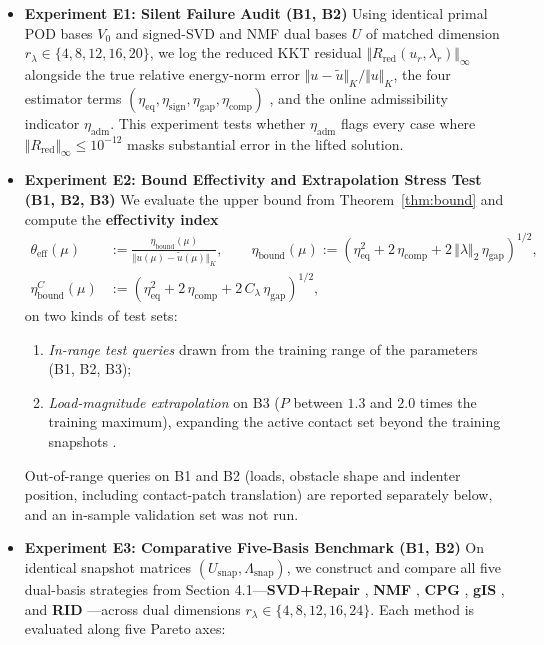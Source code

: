 \documentclass[11pt,a4paper]{article}
\providecommand{\tightlist}{\setlength{\itemsep}{0pt}\setlength{\parskip}{0pt}}
\begin{document}
\begin{itemize}
\item
  \textbf{Experiment E1: Silent Failure Audit (B1, B2)}
  Using identical primal POD bases \(V_0\) and signed-SVD and NMF dual bases \(U\) of matched dimension \(r_\lambda \in \{4, 8, 12, 16, 20\}\), we log the reduced KKT residual \(\Vert R_{\text{red}}(u_r, \lambda_r)\Vert_\infty\) alongside the true relative energy-norm error \(\Vert u - \tilde{u}\Vert_K / \Vert u\Vert_K\), the four estimator terms \((\eta_{\text{eq}}, \eta_{\text{sign}}, \eta_{\text{gap}}, \eta_{\text{comp}})\) \cite{hild2007residual, banz2024generic, banz2026posteriori}, and the online admissibility indicator \(\eta_{\text{adm}}\). This experiment tests whether \(\eta_{\text{adm}}\) flags every case where \(\Vert R_{\text{red}}\Vert_\infty \le 10^{-12}\) masks substantial error in the lifted solution.
\item
  \textbf{Experiment E2: Bound Effectivity and Extrapolation Stress Test (B1, B2, B3)}
  We evaluate the upper bound from Theorem~\ref{thm:bound} and compute the \textbf{effectivity index} \cite{hild2007residual, zhang2014duality, fontana2024guaranteed}
  \begin{equation}\label{eq:eff}\begin{aligned}
  \theta_{\text{eff}}(\mu) &:= \frac{\eta_{\text{bound}}(\mu)}{\Vert u(\mu) - \tilde{u}(\mu)\Vert_K}, \qquad \eta_{\text{bound}}(\mu) := \left( \eta_{\text{eq}}^2 + 2\,\eta_{\text{comp}} + 2\,\Vert \lambda\Vert_2\,\eta_{\text{gap}} \right)^{1/2}, \\
  \eta_{\text{bound}}^{C}(\mu) &:= \left( \eta_{\text{eq}}^2 + 2\,\eta_{\text{comp}} + 2\,C_\lambda\,\eta_{\text{gap}} \right)^{1/2},
  \end{aligned}\end{equation}
  on two kinds of test sets:

  \begin{enumerate}
  \def\labelenumi{\arabic{enumi}.}
  \tightlist
  \item
    \emph{In-range test queries} drawn from the training range of the parameters (B1, B2, B3);
  \item
    \emph{Load-magnitude extrapolation} on B3 (\(P\) between \(1.3\) and \(2.0\) times the training maximum), expanding the active contact set beyond the training snapshots \cite{benaceur2020reduced}.
  \end{enumerate}
  Out-of-range queries on B1 and B2 (loads, obstacle shape and indenter position, including contact-patch translation) are reported separately below, and an in-sample validation set was not run.
\item
  \textbf{Experiment E3: Comparative Five-Basis Benchmark (B1, B2)}
  On identical snapshot matrices \((U_{\text{snap}}, \Lambda_{\text{snap}})\), we construct and compare all five dual-basis strategies from Section 4.1---\textbf{SVD+Repair} \cite{leberre2022condition}, \textbf{NMF} \cite{balajewicz2016projection}, \textbf{CPG} \cite{benaceur2020reduced}, \textbf{gIS} \cite{sambataro2026model, kollepara2024sparse}, and \textbf{RID} \cite{fauque2018hybrid, leberre2022condition}---across dual dimensions \(r_\lambda \in \{4, 8, 12, 16, 24\}\). Each method is evaluated along five Pareto axes:


\end{itemize}
\end{document}
